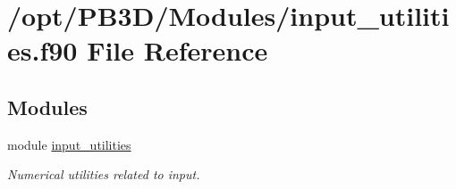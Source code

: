 \hypertarget{input__utilities_8f90}{}\section{/opt/\+P\+B3\+D/\+Modules/input\+\_\+utilities.f90 File Reference}
\label{input__utilities_8f90}
\subsection*{Modules}
\begin{DoxyCompactItemize}
\item 
module \hyperlink{namespaceinput__utilities}{input\+\_\+utilities}
\begin{DoxyCompactList}\small\item\em Numerical utilities related to input. \end{DoxyCompactList}\end{DoxyCompactItemize}
